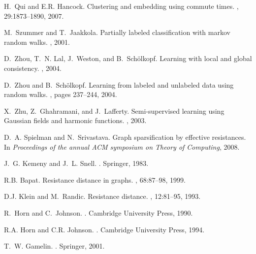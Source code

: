 \documentclass[10pt,twocolumn]{article}
\numberwithin{equation}{section}
\begin{document}
\begin{thebibliography}{10}
H.~Qui and E.R. Hancock.
\newblock Clustering and embedding using commute times.
,
  29:1873--1890, 2007.

M.~Szummer and T.~Jaakkola.
\newblock Partially labeled classification with markov random walks.
, 2001.

D.~Zhou, T.~N. Lal, J.~Weston, and B.~Sch\"{o}lkopf.
\newblock Learning with local and global consistency.
, 2004.

D.~Zhou and B.~Sch\"{o}lkopf.
\newblock Learning from labeled and unlabeled data using random walks.
, pages 237--244,
  2004.

X.~Zhu, Z.~Ghahramani, and J.~Lafferty.
\newblock Semi-supervised learning using {G}aussian fields and harmonic
  functions.
, 2003.

D.~A. Spielman and N.~Srivastava.
\newblock Graph sparsification by effective resistances.
\newblock In {\em Proceedings of the annual {ACM} symposium on Theory of
  Computing}, 2008.

J.~G. Kemeny and J.~L. Snell.
.
\newblock Springer, 1983.

R.B. Bapat.
\newblock Resistance distance in graphs.
, 68:87--98, 1999.

D.J. Klein and M.~Randic.
\newblock Resistance distance.
, 12:81--95, 1993.

R.~Horn and C.~Johnson.
.
\newblock Cambridge University Press, 1990.

R.A. Horn and C.R. Johnson.
.
\newblock Cambridge University Press, 1994.

T.~W. Gamelin.
.
\newblock Springer, 2001.


\end{thebibliography}
\end{document}
